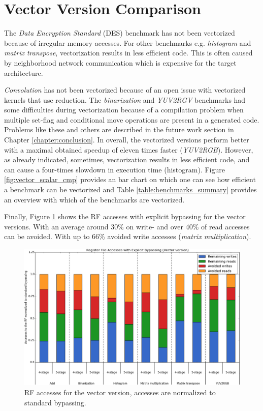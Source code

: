 \section{Vector Version Comparison}
The \emph{Data Encryption Standard} (DES) benchmark has not been vectorized because of irregular memory accesses. For other benchmarks e.g. \emph{histogram} and \emph{matrix transpose}, vectorization results in less efficient code. This is often caused by neighborhood network communication which is expensive for the target architecture.

\emph{Convolution} has not been vectorized because of an open issue with vectorized kernels that use reduction. The \emph{binarization} and \emph{YUV2RGV} benchmarks had some difficulties during vectorization because of a compilation problem when multiple set-flag and conditional move operations are present in a generated code. Problems like these and others are described in the future work section in Chapter \ref{chapter:conclusion}. In overall, the vectorized versions perform better with a maximal obtained speedup of eleven times faster (\emph{YUV2RGB}). However, as already indicated, sometimes, vectorization results in less efficient code, and can cause a four-times slowdown in execution time (histogram). Figure \ref{fig:vector_scalar_cmp} provides an bar chart on which one can see how efficient a benchmark can be vectorized and Table \ref{table:benchmarks_summary} provides an overview with which of the benchmarks are vectorized.

Finally, Figure \ref{fig:vec_accesses} shows the RF accesses with explicit bypassing for the vector versions. With an average around 30\% on write- and over 40\% of read accesses can be avoided. With up to 66\% avoided write accesses (\emph{matrix multiplication}). 

\begin{figure}[t!]
\centering
\hspace*{-.12in}
\includegraphics[width=.875\textwidth]{figures/stats/vec_accesses}
\caption{RF accesses for the vector version, accesses are normalized to standard bypassing.}
\label{fig:vec_accesses}
\end{figure}



